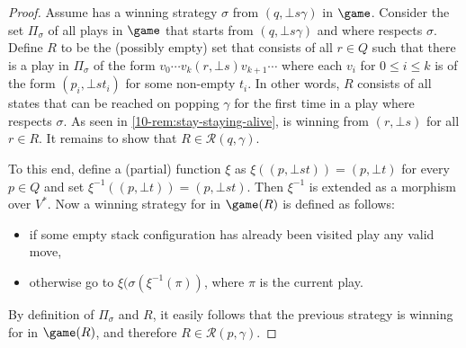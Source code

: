 \begin{proof}
Assume \Eve has a winning strategy $\sigma$ from $(q,\bot s\gamma)$ in $\game$. Consider the set $\Pi_\sigma$ of all plays in $\game$ that starts from $(q,\bot s\gamma)$ and where \Eve respects $\sigma$. Define $R$ to be the (possibly empty) set that consists of all $r\in Q$ such that there is a play in $\Pi_\sigma$ of the form $v_0\cdots v_k (r,\bot s) v_{k+1}\cdots$ where each $v_i$ for $0\leq i\leq k$ is of the form $(p_i,\bot s t_i)$ for some non-empty $t_i$. In other words, $R$ consists of all states that can be reached on popping $\gamma$ for the first time in a play where \Eve respects $\sigma$. As seen in \cref{10-rem:stay-staying-alive}, \Eve is winning from $(r,\bot s)$ for all $r \in R$. It remains to show that $R\in\mathcal{R}(q,\gamma)$.

To this end, define a (partial) function $\xi$ as $\xi((p,\bot s t))=(p,\bot t)$ for every $p\in Q$ and set $\xi^{-1}((p,\bot t))=(p,\bot s t)$. Then $\xi^{-1}$ is extended as a morphism over $V^*$.  Now a winning strategy for \Eve in $\game(R)$ is defined as follows:
\begin{itemize}
\item if some empty stack configuration has already been visited play any valid move, 
\item otherwise go to $\xi(\sigma(\xi^{-1}(\pi))$, where $\pi$ is the current play.
\end{itemize}
By definition of $\Pi_\sigma$ and $R$, it easily follows that the previous strategy is winning for \Eve in $\game(R)$, and therefore $R\in\mathcal{R}(p,\gamma)$. 


\end{proof}
